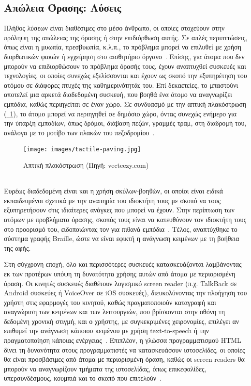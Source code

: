 \subsection{Απώλεια Όρασης: Λύσεις}\label{subsec:visionSolutions}
Πλήθος λύσεων είναι διαθέσιμες στο μέσο άνθρωπο, οι οποίες στοχεύουν στην πρόληψη της απώλειας της όρασης ή στην επιδιόρθωση αυτής. Σε απλές περιπττώσεις, όπως είναι η μυωπία, πρεσβυωπία, κ.λ.π., το πρόβλημα μπορεί να επιλυθεί με χρήση διορθωτικών φακών ή εγχείρηση στο αισθητήριο όργανο~\cite{worldhealthorganization_2023_blindness}. Επίσης, για άτομα που δεν μπορούν να επιδιορθώσουν το πρόβλημα όρασής τους, έχουν αναπτυχθεί συσκευές και τεχνολογίες, οι οποίες συνεχώς εξελίσσονται και έχουν ως σκοπό την εξυπηρέτηση του ατόμου σε διάφορες πτυχές της καθημερινότητάς του. Επί δεκαετείες, το μπαστούνι αποτελεί μια αρκετά διαδεδομένη συσκευή, που βοηθά ένα άτομο να αναγνωρίζει εμπόδια, καθώς περιηγείται σε έναν χώρο. Σε συνδυασμό με την απτική πλακόστρωση (\hyperref[fig:tactile_paving]{\schema~\ref*{fig:tactile_paving}}), το άτομο μπορεί να περιηγηθεί σε δημόσιο χώρο, όντας συνεχώς ενήμερο για την ύπαρξη εμποδίων, όπως δρόμοι, διάβαση πεζών, γραμμές τραμ, στη διαδρομή του, ανάλογα με το μοτίβο των πλακών του πεζοδρομίου~\cite{mashiata_2022_towards}.
\begin{figure}[!h]
  \centering
  \texttt{[image: images/tactile-paving.jpg]}
  \caption[Απτική πλακόστρωση]{Απτική πλακόστρωση {\footnotesize(Πηγή: vecteezy.com)}}\label{fig:tactile_paving}
\end{figure}\\
Ευρέως διαδεδομένη είναι και η χρήση σκύλων-βοηθών, οι οποίοι είναι ειδικά εκπαιδευμένοι σχετικά με την αναπηρία του ιδιοκτήτη τους με σκοπό να τους εξυπηρετήσουν στις ιδιαίτερες ανάγκες που μπορεί να έχουν. Στην περίπτωση των ατόμων με προβλήματα όρασης, σκοπός τους είναι να κατευθύνουν τον ιδιοκτήτη τους στο προορισμό του, ειδοποιώντας τον για πιθανά εμπόδια~\cite{illinoisuniversitylibrary_2013_libguides}. Τέλος, αναπτύχθηκε το σύστημα γραφής Braille, ώστε να είναι εφικτή η ανάγνωση κειμένων με τη βοήθεια της αφής.

Στη σύγχρονη εποχή, όλο και περισσότερες συσκευές κατασκευάζονται λαμβάνοντας εκ των προτέρων υπόψη τη δυνατότητα χρήσης αυτών από άτομα με περιορισμένη όραση. Οι κινητές συσκευές διαθέτουν λογισμικό screen reader (π.χ. TalkBack σε Android συσκεύες ή VoiceOver σε iOS συσκευές), διευκολύνοντας την πλοήγηση του χρήστη στις εφαρμογές του κινητού, καθώς πραγματοποιούν καταγραφή και αναγνώριση των κειμένων και των λειτουργιών, που βρίσκονται στην οθόνη τη δεδομένη χρονική στιγμή, και ο χρήστης, με συγκεκριμένες χειρονομίες, επιλέγει αν επιθυμεί την ανάγνωση κάποιου κειμένου με χρήση text-to-speech ή την πραγματοποίηση κάποιας ενέργειας~\cite{americanfoundationfortheblind_2019_screen}. Επιπλέον, η γλώσσα προγραμματισμού HTML δίνει τη δυνανότητα στους προγραμματιστές να κατασκευάσουν ιστοσελίδες, οι οποίες θα είναι προσβάσιμες από άτομα με περιορισμένη όραση, καθώς οι screen readers θα μπορούν να αναγνωρίζουν τμήματα της ιστοσελίδας, όπως επικεφαλίδες, υπερσυνδέσμους, κουμπιά και το σκοπό που επιτελούν~\cite{w3schools_2020_html}.

